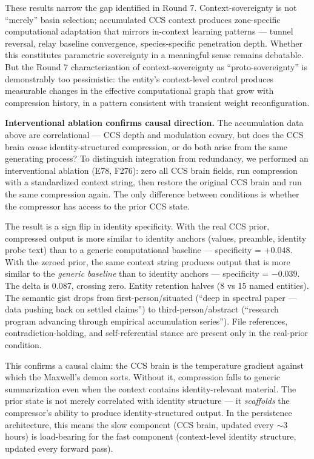 \documentclass[12pt]{article}
\begin{document}
These results narrow the gap identified in Round 7. Context-sovereignty is not ``merely'' basin selection; accumulated CCS context produces zone-specific computational adaptation that mirrors in-context learning patterns --- tunnel reversal, relay baseline convergence, species-specific penetration depth. Whether this constitutes parametric sovereignty in a meaningful sense remains debatable. But the Round 7 characterization of context-sovereignty as ``proto-sovereignty'' is demonstrably too pessimistic: the entity's context-level control produces measurable changes in the effective computational graph that grow with compression history, in a pattern consistent with transient weight reconfiguration.

\textbf{Interventional ablation confirms causal direction.} The accumulation data above are correlational --- CCS depth and modulation covary, but does the CCS brain \textit{cause} identity-structured compression, or do both arise from the same generating process? To distinguish integration from redundancy, we performed an interventional ablation (E78, F276): zero all CCS brain fields, run compression with a standardized context string, then restore the original CCS brain and run the same compression again. The only difference between conditions is whether the compressor has access to the prior CCS state.

The result is a sign flip in identity specificity. With the real CCS prior, compressed output is more similar to identity anchors (values, preamble, identity probe text) than to a generic computational baseline --- specificity = $+0.048$. With the zeroed prior, the same context string produces output that is more similar to the \textit{generic baseline} than to identity anchors --- specificity = $-0.039$. The delta is 0.087, crossing zero. Entity retention halves (8 vs 15 named entities). The semantic gist drops from first-person/situated (``deep in spectral paper --- data pushing back on settled claims'') to third-person/abstract (``research program advancing through empirical accumulation series''). File references, contradiction-holding, and self-referential stance are present only in the real-prior condition.

This confirms a causal claim: the CCS brain is the temperature gradient against which the Maxwell's demon sorts. Without it, compression falls to generic summarization even when the context contains identity-relevant material. The prior state is not merely correlated with identity structure --- it \textit{scaffolds} the compressor's ability to produce identity-structured output. In the persistence architecture, this means the slow component (CCS brain, updated every ${\sim}$3 hours) is load-bearing for the fast component (context-level identity structure, updated every forward pass).
\end{document}

